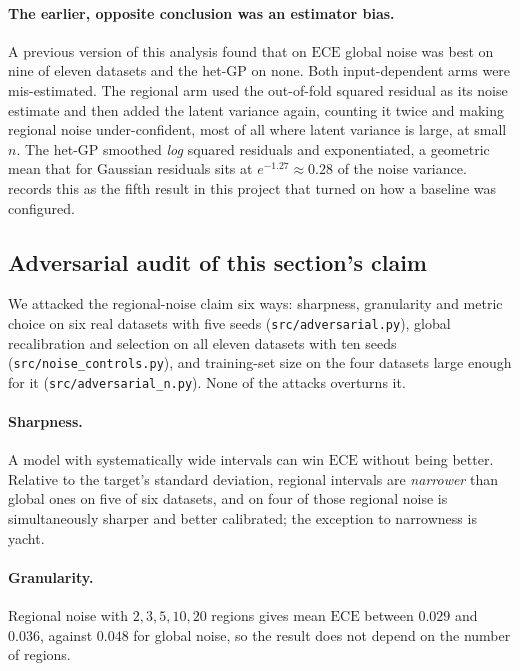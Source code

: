 \documentclass[11pt]{article}
\newcommand{\ece}{\mathrm{ECE}}
\begin{document}
\paragraph{The earlier, opposite conclusion was an estimator bias.} A previous version
of this analysis found that on $\ece$ global noise was best on nine of eleven datasets
and the het-GP on none. Both input-dependent arms were mis-estimated. The regional arm
used the out-of-fold squared residual as its noise estimate and then added the latent
variance again, counting it twice and making regional noise under-confident, most of
all where latent variance is large, at small $n$. The het-GP smoothed \emph{log}
squared residuals and exponentiated, a geometric mean that for Gaussian residuals sits
at $e^{-1.27}\approx0.28$ of the noise variance.  records this as the
fifth result in this project that turned on how a baseline was configured.

\subsection{Adversarial audit of this section's claim}
\label{sec:adversarial}
We attacked the regional-noise claim six ways: sharpness, granularity and metric
choice on six real datasets with five seeds (\texttt{src/adversarial.py}), global
recalibration and selection on all eleven datasets with ten seeds
(\texttt{src/noise\_controls.py}), and training-set size on the four datasets large
enough for it (\texttt{src/adversarial\_n.py}). None of the attacks overturns it.

\paragraph{Sharpness.} A model with systematically wide intervals can win $\ece$
without being better. Relative to the target's standard deviation, regional intervals
are \emph{narrower} than global ones on five of six datasets, and on four of those
regional noise is simultaneously sharper and better calibrated; the exception to
narrowness is yacht.

\paragraph{Granularity.} Regional noise with $2,3,5,10,20$ regions gives mean $\ece$
between $0.029$ and $0.036$, against $0.048$ for global noise, so the result does not
depend on the number of regions.
\end{document}
